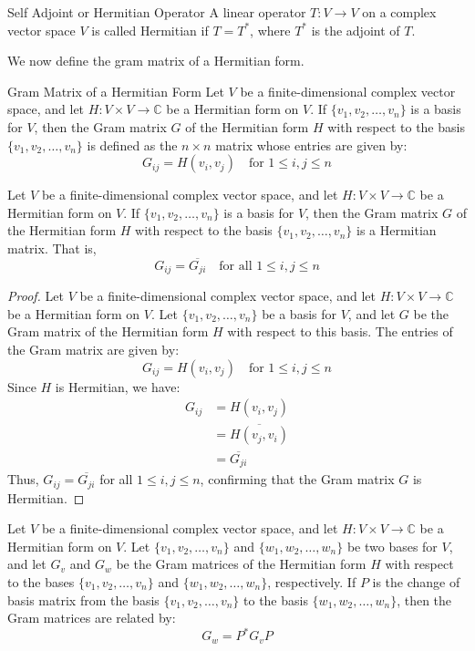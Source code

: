 \documentclass[openany]{book}
\renewcommand{\C}{\mathbb{C}}
\begin{document}
\begin{mydefinition}{Self Adjoint or Hermitian Operator}
A linear operator $T: V \to V$ on a complex vector space $V$ is called Hermitian if $T = T^*$, where $T^*$ is the adjoint of $T$. 
\end{mydefinition}
We now define the gram matrix of a Hermitian form.
\begin{mydefinition}{Gram Matrix of a Hermitian Form}
Let $V$ be a finite-dimensional complex vector space, and let $H: V \times V \to \C$ be a Hermitian form on $V$. If $\{v_1, v_2, \ldots, v_n\}$ is a basis for $V$, then the Gram matrix $G$ of the Hermitian form $H$ with respect to the basis $\{v_1, v_2, \ldots, v_n\}$ is defined as the $n \times n$ matrix whose entries are given by:
$$G_{ij} = H(v_i, v_j) \quad \text{for } 1 \leq i, j \leq n$$
\end{mydefinition}
\begin{mytheorem}
Let $V$ be a finite-dimensional complex vector space, and let $H: V \times V \to \C$ be a Hermitian form on $V$. If $\{v_1, v_2, \ldots, v_n\}$ is a basis for $V$, then the Gram matrix $G$ of the Hermitian form $H$ with respect to the basis $\{v_1, v_2, \ldots, v_n\}$ is a Hermitian matrix. That is,
$$G_{ij} = \overline{G_{ji}} \quad \text{for all }1 \leq i, j \leq n$$
\end{mytheorem}
\begin{proof}
Let $V$ be a finite-dimensional complex vector space, and let $H: V \times V \to \C$ be a Hermitian form on $V$. Let $\{v_1, v_2, \ldots, v_n\}$ be a basis for $V$, and let $G$ be the Gram matrix of the Hermitian form $H$ with respect to this basis. The entries of the Gram matrix are given by:
$$G_{ij} = H(v_i, v_j) \quad \text{for } 1 \leq i, j \leq n$$
Since $H$ is Hermitian, we have:
\[\begin{aligned}
G_{ij} &= H(v_i, v_j) \\
&= \overline{H(v_j, v_i)} \\
&= \overline{G_{ji}}
\end{aligned}\]
Thus, $G_{ij} = \overline{G_{ji}}$ for all $1 \leq i, j \leq n$, confirming that the Gram matrix $G$ is Hermitian.
\end{proof}
\begin{mytheorem}
Let $V$ be a finite-dimensional complex vector space, and let $H: V \times V \to \C$ be a Hermitian form on $V$. Let $\{v_1, v_2, \ldots, v_n\}$ and $\{w_1, w_2, \ldots, w_n\}$ be two bases for $V$, and let $G_v$ and $G_w$ be the Gram matrices of the Hermitian form $H$ with respect to the bases $\{v_1, v_2, \ldots, v_n\}$ and $\{w_1, w_2, \ldots, w_n\}$, respectively. If $P$ is the change of basis matrix from the basis $\{v_1, v_2, \ldots, v_n\}$ to the basis $\{w_1, w_2, \ldots, w_n\}$, then the Gram matrices are related by:
$$G_w = P^* G_v P$$
\end{mytheorem}
\end{document}
